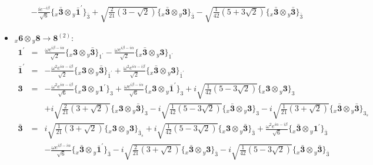 \documentclass[english]{article}
\newcommand{\rep}[1]{\mathbf{#1}}
\newcommand{\repx}[2]{{}_{#2}\mathbf{#1}}
\newcommand{\subcg}[3]{\big\{ \repx{#1}{x}\otimes\repx{#2}{y}\big\}^{}_{#3}}
\begin{document}
\begin{itemize}
\begin{eqnarray*}
 & & -\frac{i e^{-i \beta }}{\sqrt{6}}\subcg{\bar{3}}{\bar{1}^{\prime}}{\bar{3}}+\sqrt{\frac{2}{21} \left(3-\sqrt{2}\right)}\subcg{\bar{3}}{3}{\bar{3}}-\sqrt{\frac{1}{42} \left(5+3 \sqrt{2}\right)}\subcg{\bar{3}}{\bar{3}}{\bar{3}}
\end{eqnarray*}
\item $\repx{6}{x}\otimes\repx{8}{y}\to\rep{8}^{(2)}$:
\begin{eqnarray*}
\rep{1^{\prime}} &=& \frac{\omega  e^{i \beta -i \alpha }}{\sqrt{2}}\subcg{3}{\bar{3}}{1^{\prime}}-\frac{\omega  e^{i \beta -i \alpha }}{\sqrt{2}}\subcg{\bar{3}}{3}{1^{\prime}}
\\
\rep{\bar{1}^{\prime}} &=& -\frac{\omega ^2 e^{i \alpha -i \beta }}{\sqrt{2}}\subcg{3}{\bar{3}}{\bar{1}^{\prime}}+\frac{\omega ^2 e^{i \alpha -i \beta }}{\sqrt{2}}\subcg{\bar{3}}{3}{\bar{1}^{\prime}}
\\
\rep{3} &=& -\frac{\omega ^2 e^{i \alpha -i \beta }}{\sqrt{6}}\subcg{3}{1^{\prime}}{3}+\frac{\omega  e^{i \beta -i \alpha }}{\sqrt{6}}\subcg{3}{\bar{1}^{\prime}}{3}+i \sqrt{\frac{1}{42} \left(5-3 \sqrt{2}\right)}\subcg{3}{3}{3} \\ 
 & & +i \sqrt{\frac{2}{21} \left(3+\sqrt{2}\right)}\subcg{3}{\bar{3}}{3}-i \sqrt{\frac{1}{42} \left(5-3 \sqrt{2}\right)}\subcg{\bar{3}}{3}{3}-i \sqrt{\frac{1}{21} \left(3+\sqrt{2}\right)}\subcg{\bar{3}}{\bar{3}}{3_{s}}
\\
\rep{\bar{3}} &=& i \sqrt{\frac{1}{21} \left(3+\sqrt{2}\right)}\subcg{3}{3}{\bar{3}_{s}}+i \sqrt{\frac{1}{42} \left(5-3 \sqrt{2}\right)}\subcg{3}{\bar{3}}{\bar{3}}+\frac{\omega ^2 e^{i \alpha -i \beta }}{\sqrt{6}}\subcg{\bar{3}}{1^{\prime}}{\bar{3}} \\ 
 & & -\frac{\omega  e^{i \beta -i \alpha }}{\sqrt{6}}\subcg{\bar{3}}{\bar{1}^{\prime}}{\bar{3}}-i \sqrt{\frac{2}{21} \left(3+\sqrt{2}\right)}\subcg{\bar{3}}{3}{\bar{3}}-i \sqrt{\frac{1}{42} \left(5-3 \sqrt{2}\right)}\subcg{\bar{3}}{\bar{3}}{\bar{3}}
\end{eqnarray*}
\end{itemize}
\end{document}
